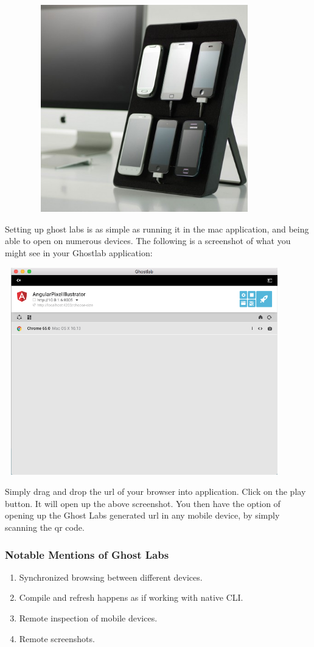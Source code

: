 \includegraphics[width=12.1cm, height=9cm]{pwa/pwa-toolset-physical-devices/device-lab-stand}

Setting up ghost labs is as simple as running it in the mac application, and
being able to open on numerous devices. The following is a screenshot of what
you might see in your Ghostlab application:


\includegraphics[width=12.1cm, height=9cm]{pwa/pwa-toolset-physical-devices/ghostlabs-screenshot}

Simply drag and drop the url of your browser into application. Click on the play
button. It will open up the above screenshot. You then have the option of
opening up the Ghost Labs generated url in any mobile device, by simply
scanning the qr code.

\subsubsection{ Notable Mentions of Ghost Labs }
\begin{enumerate}
  \item Synchronized browsing between different devices.
  \item Compile and refresh happens as if working with native CLI.
  \item Remote inspection of mobile devices.
  \item Remote screenshots.
\end{enumerate}


